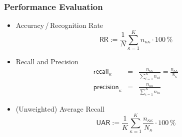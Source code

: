 \begin{frame}[fragile]
   \frametitle{Performance Evaluation \cont}


   \begin{itemize}
      \item Accuracy\,/\,Recognition Rate
           {\small
              \begin{displaymath}
                 \mathsf{RR} := \frac{1}{N} \sum_{\kappa=1}^{K}n_{\kappa\kappa} \cdot 100\,\%
              \end{displaymath}
              \pause
           }
      \item Recall and Precision
           {\small
              \begin{eqnarray*}
                 \mathsf{recall}_\kappa    & = & \frac{n_{\kappa\kappa}}{\sum_{i=1}^K n_{\kappa i}}
                 = \frac{n_{\kappa\kappa}}{N_\kappa} \\
                 \mathsf{precision}_\kappa & = & \frac{n_{\kappa\kappa}}{\sum_{i=1}^K n_{i \kappa}}
              \end{eqnarray*}
              \pause
           }
      \item (Unweighted) Average Recall
           {\small
              \begin{displaymath}
                 \mathsf{UAR} := \frac{1}{K} \sum_{\kappa=1}^K \frac{n_{\kappa\kappa}}{N_\kappa} \cdot 100\,\%
              \end{displaymath}
           }
   \end{itemize}
\end{frame}



